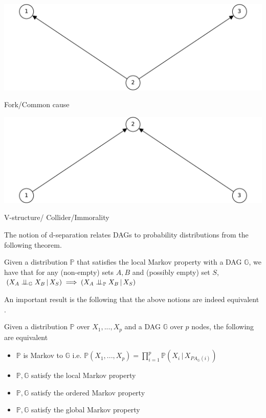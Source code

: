 \documentclass{tufte-book}
\begin{document}
 \begin{marginfigure} \includegraphics[width=\linewidth]{ ./figures/fork.pdf}\caption{ Fork/Common cause} \end{marginfigure} 
 \begin{marginfigure} \includegraphics[width=\linewidth]{ ./figures/collider.pdf}\caption{ V-structure/ Collider/Immorality} \end{marginfigure} 


The notion of d-separation relates DAGs to probability distributions from the following theorem.
\begin{definition}\label{thm:dagci}

Given a distribution $\mathbb{P}$ that satisfies the local Markov property with a DAG $\mathbb{G}$, we have that for any (non-empty) sets $A,B$ and (possibly empty) set $S$, $(X_A \perp \!\!\! \perp_{\mathbb{G}} X_B \,|\,X_S) \implies (X_A \perp \!\!\! \perp_{\mathbb{P}} X_B \,|\, X_S)$


\end{definition}

An important result is the following that the above notions are indeed equivalent \cite{duarte-2020-algeb}.

\begin{theorem}\label{thm:markovdag}
Given a distribution $\mathbb{P}$ over $X_1,...,X_p$ and a DAG $\mathbb{G}$ over $p$ nodes, the following are equivalent

\begin{itemize}
\item $\mathbb{P}$ is Markov to $\mathbb{G}$ i.e. $\mathbb{P}(X_1,...,X_p) = \prod_{i=1}^p \mathbb{P}(X_i \, |\, X_{PA_{\mathbb{G}}(i)})$
\item $\mathbb{P}, \mathbb{G}$ satisfy the local Markov property
\item $\mathbb{P}, \mathbb{G}$ satisfy the ordered Markov property
\item $\mathbb{P}, \mathbb{G}$ satisfy the global Markov property
\end{itemize}

\end{theorem}
\end{document}
